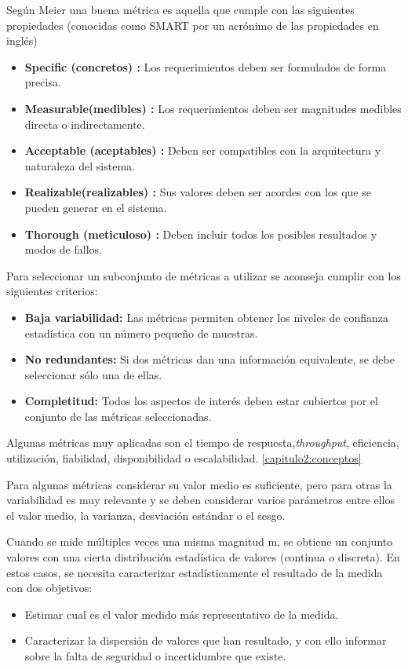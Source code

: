 Según Meier \cite{Meier:2007:PTG:1461439} una buena métrica es aquella que cumple con las siguientes propiedades (conocidas como SMART por un acrónimo de las propiedades en inglés)
\begin{itemize}
\item
\textbf{Specific (concretos) :} Los requerimientos deben ser formulados de forma precisa.
\item
\textbf{Measurable(medibles) :} Los requerimientos deben ser magnitudes medibles directa 
o indirectamente.
\item
\textbf{Acceptable (aceptables) :} Deben ser compatibles con la arquitectura y 
naturaleza del sistema.
\item
\textbf{Realizable(realizables) :} Sus valores deben ser acordes con los que se pueden 
generar en el sistema.
\item
\textbf{Thorough (meticuloso) :} Deben incluir todos los posibles resultados y modos 
de fallos. 
\end{itemize}

Para seleccionar un subconjunto de métricas a utilizar se aconseja cumplir con los siguientes criterios:
\begin{itemize}
\item
\textbf{Baja variabilidad:} Las métricas permiten obtener los niveles de confianza estadística
con un número pequeño de muestras.
\item
\textbf{No redundantes:} Si dos métricas dan una información equivalente, se 
debe seleccionar sólo una de ellas.
\item
\textbf{Completitud:} Todos los aspectos de interés deben estar cubiertos por el 
conjunto de las métricas seleccionadas.
\end{itemize}

Algunas métricas muy aplicadas son el tiempo de respuesta,\emph{throughput}, eficiencia, utilización, fiabilidad, disponibilidad o escalabilidad. \ref{capitulo2:conceptos}

Para algunas métricas considerar su valor medio es suficiente, pero para otras la variabilidad es muy relevante y se deben considerar varios parámetros entre ellos el valor medio, la varianza, desviación estándar o el sesgo.

Cuando se mide múltiples veces una misma magnitud m, se obtiene un conjunto valores con una cierta  distribución estadística de valores (continua o discreta). En estos casos, se necesita caracterizar 
estadísticamente el resultado de la medida con dos objetivos: 
\begin{itemize}
\item
Estimar cual es el valor medido más representativo de la medida.
\item
Caracterizar la  dispersión de valores que han resultado, y con ello informar sobre la falta de seguridad o incertidumbre que existe.
\end{itemize}

